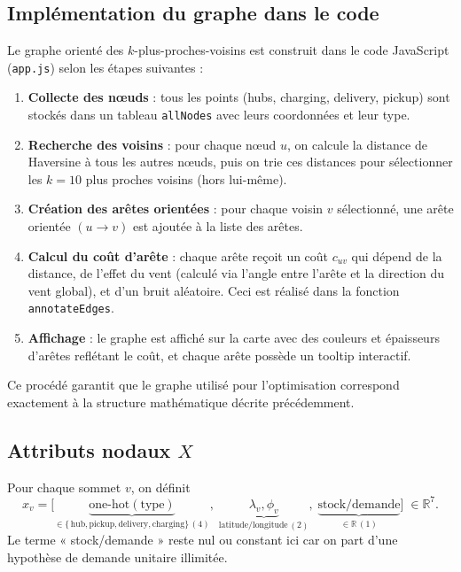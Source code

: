 \documentclass[11pt,a4paper]{article}
\newcommand{\R}{\mathbb{R}}
\begin{document}
\subsection*{Implémentation du graphe dans le code}
Le graphe orienté des \(k\)-plus-proches-voisins est construit dans le code JavaScript (\texttt{app.js}) selon les étapes suivantes :
\begin{enumerate}
  \item \textbf{Collecte des nœuds} : tous les points (hubs, charging, delivery, pickup) sont stockés dans un tableau \texttt{allNodes} avec leurs coordonnées et leur type.
  \item \textbf{Recherche des voisins} : pour chaque nœud \(u\), on calcule la distance de Haversine à tous les autres nœuds, puis on trie ces distances pour sélectionner les \(k=10\) plus proches voisins (hors lui-même).
  \item \textbf{Création des arêtes orientées} : pour chaque voisin \(v\) sélectionné, une arête orientée \((u \to v)\) est ajoutée à la liste des arêtes.
  \item \textbf{Calcul du coût d'arête} : chaque arête reçoit un coût $c_{uv}$ qui dépend de la distance, de l'effet du vent (calculé via l'angle entre l'arête et la direction du vent global), et d'un bruit aléatoire. Ceci est réalisé dans la fonction \texttt{annotateEdges}.
  \item \textbf{Affichage} : le graphe est affiché sur la carte avec des couleurs et épaisseurs d'arêtes reflétant le coût, et chaque arête possède un tooltip interactif.
\end{enumerate}
Ce procédé garantit que le graphe utilisé pour l'optimisation correspond exactement à la structure mathématique décrite précédemment.

\subsection{Attributs nodaux \texorpdfstring{\(X\)}{X}}
Pour chaque sommet \(v\), on définit
\[
  x_v = \bigl[
    \underbrace{\mathrm{one\text{-}hot}(\mathrm{type})}_{\in\{\,\text{hub},\text{pickup},\text{delivery},\text{charging}\}\, (4)},
    \;
    \underbrace{\lambda_v,\phi_v}_{\text{latitude/longitude}\,(2)},
    \;
    \underbrace{\text{stock/demande}}_{\in\R\, (1)}
  \bigr]\;\in\R^{7}.
\]
Le terme « stock/demande » reste nul ou constant ici car on part d'une hypothèse de demande unitaire illimitée.

\end{document}
